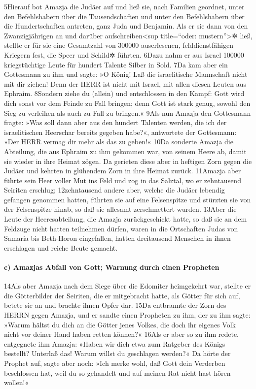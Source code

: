 5Hierauf bot Amazja die Judäer auf und ließ sie, nach Familien geordnet,
unter den Befehlshabern über die Tausendschaften und unter den
Befehlshabern über die Hundertschaften antreten, ganz Juda und Benjamin.
Als er sie dann von den Zwanzigjährigen an und darüber
aufschreiben\textless sup title=``oder: mustern''\textgreater✲ ließ,
stellte er für sie eine Gesamtzahl von 300000 auserlesenen,
felddienstfähigen Kriegern fest, die Speer und Schild✲ führten. 6Dazu
nahm er aus Israel 100000 kriegstüchtige Leute für hundert Talente
Silber in Sold. 7Da kam aber ein Gottesmann zu ihm und sagte: »O König!
Laß die israelitische Mannschaft nicht mit dir ziehen! Denn der HERR ist
nicht mit Israel, mit allen diesen Leuten aus Ephraim. 8Sondern ziehe du
(allein) und entschlossen in den Kampf: Gott wird dich sonst vor dem
Feinde zu Fall bringen; denn Gott ist stark genug, sowohl den Sieg zu
verleihen als auch zu Fall zu bringen.« 9Als nun Amazja den Gottesmann
fragte: »Was soll dann aber aus den hundert Talenten werden, die ich der
israelitischen Heerschar bereits gegeben habe?«, antwortete der
Gottesmann: »Der HERR vermag dir mehr als das zu geben!« 10Da sonderte
Amazja die Abteilung, die aus Ephraim zu ihm gekommen war, von seinem
Heere ab, damit sie wieder in ihre Heimat zögen. Da gerieten diese aber
in heftigen Zorn gegen die Judäer und kehrten in glühendem Zorn in ihre
Heimat zurück. 11Amazja aber führte sein Heer voller Mut ins Feld und
zog in das Salztal, wo er zehntausend Seiriten erschlug; 12zehntausend
andere aber, welche die Judäer lebendig gefangen genommen hatten,
führten sie auf eine Felsenspitze und stürzten sie von der Felsenspitze
hinab, so daß sie allesamt zerschmettert wurden. 13Aber die Leute der
Heeresabteilung, die Amazja zurückgeschickt hatte, so daß sie an dem
Feldzuge nicht hatten teilnehmen dürfen, waren in die Ortschaften Judas
von Samaria bis Beth-Horon eingefallen, hatten dreitausend Menschen in
ihnen erschlagen und reiche Beute gemacht.

\hypertarget{c-amazjas-abfall-von-gott-warnung-durch-einen-propheten}{%
\paragraph{c) Amazjas Abfall von Gott; Warnung durch einen
Propheten}\label{c-amazjas-abfall-von-gott-warnung-durch-einen-propheten}}

14Als aber Amazja nach dem Siege über die Edomiter heimgekehrt war,
stellte er die Götterbilder der Seiriten, die er mitgebracht hatte, als
Götter für sich auf, betete sie an und brachte ihnen Opfer dar. 15Da
entbrannte der Zorn des HERRN gegen Amazja, und er sandte einen
Propheten zu ihm, der zu ihm sagte: »Warum hältst du dich an die Götter
jenes Volkes, die doch ihr eigenes Volk nicht vor deiner Hand haben
retten können?« 16Als er aber so zu ihm redete, entgegnete ihm Amazja:
»Haben wir dich etwa zum Ratgeber des Königs bestellt? Unterlaß das!
Warum willst du geschlagen werden?« Da hörte der Prophet auf, sagte aber
noch: »Ich merke wohl, daß Gott dein Verderben beschlossen hat, weil du
so gehandelt und auf meinen Rat nicht hast hören wollen!«

